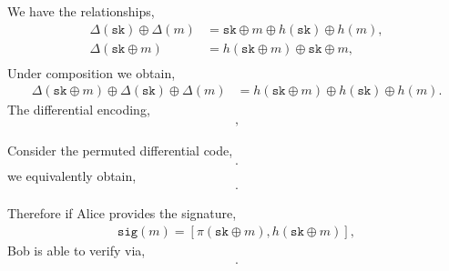 \documentclass[twocolumn, aps, amsmath, amssymb, nofootinbib, superscriptaddress, longbibliography, doublefloatfix, table-of-contents, eqsecnum, rmp]{revtex4-2}
\begin{document}
We have the relationships,
\begin{align}
	\Delta(\mathtt{sk}) \oplus \Delta(m) &= \mathtt{sk} \oplus m \oplus h(\texttt{sk}) \oplus h(m),\nonumber\\
	\Delta(\mathtt{sk} \oplus m)	 &= h(\mathtt{sk} \oplus m) \oplus \mathtt{sk} \oplus m,\nonumber\\
\end{align}
Under composition we obtain,
\begin{align}
	\Delta(\mathtt{sk} \oplus m)	 \oplus \Delta(\mathtt{sk}) \oplus \Delta(m) &= h(\mathtt{sk} \oplus m) \oplus h(\mathtt{sk}) \oplus h(m).	
\end{align}
The differential encoding,
\begin{align}
	[h(\mathtt{sk}\oplus m), \Delta(\mathtt{sk} \oplus m)],
\end{align}

Consider the permuted differential code,
\begin{align}
	[\pi(\mathtt{sk}\oplus m), \pi(\Delta(\mathtt{sk})) \oplus \pi(\Delta(m))].
\end{align}
we equivalently obtain,
\begin{align}
	[\Delta(\mathtt{sk} \oplus m) \oplus h(\mathtt{sk} \oplus m), \Delta(\mathtt{sk}) \oplus \Delta(m)].
\end{align}

Therefore if Alice provides the signature,
\begin{align}
	\mathtt{sig}(m) = [\pi(\mathtt{sk} \oplus m), h(\mathtt{sk} \oplus m)],
\end{align}	
Bob is able to verify via,
\begin{align}
		[\mathtt{sig}(m),\Delta(\mathtt{sk}) \oplus \Delta(m)].
\end{align}



%


\end{document}
